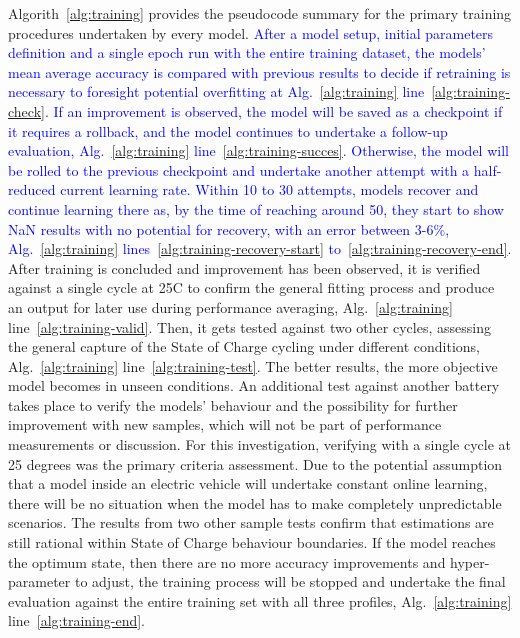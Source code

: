 %
Algorith~\ref{alg:training} provides the pseudocode summary for the primary training procedures undertaken by every model.
\textcolor{blue}{
After a model setup, initial parameters definition and a single epoch run with the entire training dataset, the models' mean average accuracy is compared with previous results to decide if retraining is necessary to foresight potential overfitting at Alg.~\ref{alg:training} line~\ref{alg:training-check}.
If an improvement is observed, the model will be saved as a checkpoint if it requires a rollback, and the model continues to undertake a follow-up evaluation, Alg.~\ref{alg:training} line~\ref{alg:training-succes}.
Otherwise, the model will be rolled to the previous checkpoint and undertake another attempt with a half-reduced current learning rate.
Within 10 to 30 attempts, models recover and continue learning there as, by the time of reaching around 50, they start to show NaN results with no potential for recovery, with an error between 3-6\%, Alg.~\ref{alg:training} lines~\ref{alg:training-recovery-start} to~\ref{alg:training-recovery-end}.
}
%
After training is concluded and improvement has been observed, it is verified against a single cycle at 25\textdegree{}C to confirm the general fitting process and produce an output for later use during performance averaging, Alg.~\ref{alg:training} line~\ref{alg:training-valid}.
Then, it gets tested against two other cycles, assessing the general capture of the State of Charge cycling under different conditions, Alg.~\ref{alg:training} line~\ref{alg:training-test}.
The better results, the more objective model becomes in unseen conditions.
An additional test against another battery takes place to verify the models' behaviour and the possibility for further improvement with new samples, which will not be part of performance measurements or discussion.
For this investigation, verifying with a single cycle at 25 degrees was the primary criteria assessment.
Due to the potential assumption that a model inside an electric vehicle will undertake constant online learning, there will be no situation when the model has to make completely unpredictable scenarios.
The results from two other sample tests confirm that estimations are still rational within State of Charge behaviour boundaries.
If the model reaches the optimum state, then there are no more accuracy improvements and hyper-parameter to adjust, the training process will be stopped and undertake the final evaluation against the entire training set with all three profiles, Alg.~\ref{alg:training} line~\ref{alg:training-end}.
